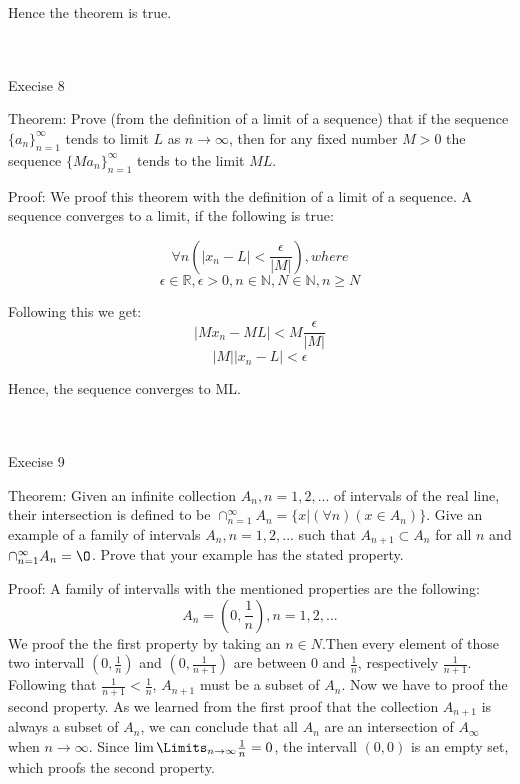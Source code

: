 \documentclass[12pt]{article}
\begin{document}
Hence the theorem is true. 



\
\\
\\

Execise 8

Theorem: Prove (from the definition of a limit of a sequence) that if the
sequence $\{a_n\}_{n=1}^{\infty}$ tends to limit $L$ as
$n\rightarrow\infty$, then for any fixed number $M>0$ the sequence
$\{Ma_n\}_{n=1}^{\infty}$ tends to the limit $ML$.

Proof: We proof this theorem with the definition of a limit of a sequence. A sequence converges to a limit, if the following is true:

\[\forall n(|x_n-L| < \frac{\epsilon}{|M|}), where\]
\[\epsilon \in \mathbb{R}, \epsilon > 0, n \in \mathbb{N}, N \in \mathbb{N}, n \geq N\]

Following this we get:
\[|Mx_n-ML| < M\frac{\epsilon}{|M|}\]
\[|M||x_n-L| < \epsilon\]

Hence, the sequence converges to ML.


\
\\
\\

Execise 9

Theorem: Given an infinite collection $A_n,n=1,2,...$ of intervals of the real line, their intersection is defined to be $\cap_{n=1}^{\infty}A_n=\{x|(\forall n)(x\in A_n)\}$. Give an example of a family of intervals $A_n,n=1,2,...$ such that $A_{n+1}\subset A_n$ for all $n$ and $\cap_{n=1}^{\infty}A_n=\O$. Prove that your example has the stated property.

Proof: A family of intervalls with the mentioned properties are the following:
\[A_n=(0,\frac{1}{n}), n = 1,2,...\]
We proof the the first property by taking an $n \in N$.Then every element of those two intervall $(0,\frac{1}{n})$ and $(0,\frac{1}{n+1})$ are between 0 and $\frac{1}{n}$, respectively  $\frac{1}{n+1}$. Following that $\frac{1}{n+1} < \frac{1}{n}$, $A_{n+1}$ must be a subset of $A_n$.
Now we have to proof the second property. As we learned from the first proof that the collection $A_{n+1}$ is always a subset of $A_n$, we can conclude that all $A_n$ are an intersection of $A_\infty$ when $n \to \infty$.
Since $\lim \Limits_{n \to \infty} \frac{1}{n} = 0$, the intervall $(0, 0)$ is an empty set, which proofs the second property. 

\
\\
\\
\end{document}

